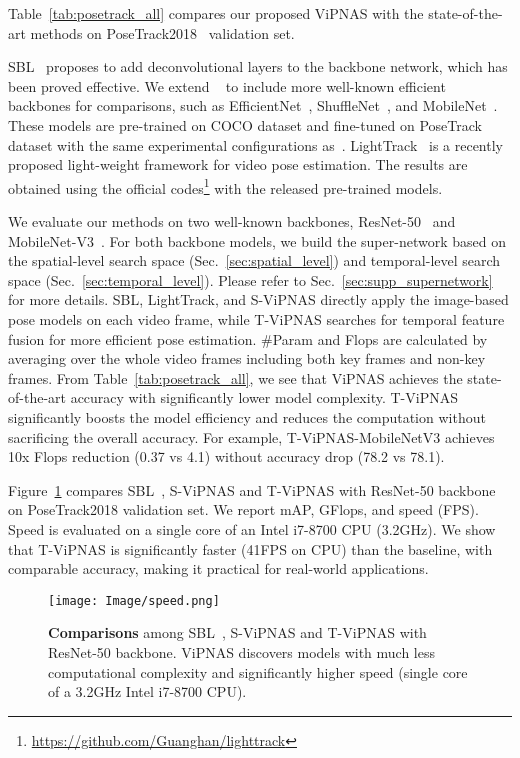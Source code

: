 \documentclass[final]{cvpr}
\begin{document}
Table~\ref{tab:posetrack_all} compares our proposed ViPNAS with the state-of-the-art methods on  PoseTrack2018~\cite{andriluka2018posetrack} validation set. 

SBL~\cite{xiao2018simple} proposes to add deconvolutional layers to the backbone network, which has been proved effective. We extend ~\cite{xiao2018simple} to include more well-known efficient backbones for comparisons, such as EfficientNet~\cite{tan2019efficientnet}, ShuffleNet~\cite{ma2018shufflenet}, and MobileNet~\cite{howard2019searching}. These models are pre-trained on COCO dataset and fine-tuned on PoseTrack dataset with the same experimental configurations as~\cite{xiao2018simple}. LightTrack~\cite{ning2019lighttrack} is a recently proposed light-weight framework for video pose estimation. The results are obtained using the official codes\footnote{\url{https://github.com/Guanghan/lighttrack}} with the released pre-trained models.

We evaluate our methods on two well-known backbones, \ie ResNet-50~\cite{he2016deep} and MobileNet-V3~\cite{howard2019searching}. For both backbone models, we build the super-network based on the spatial-level search space (Sec.~\ref{sec:spatial_level}) and temporal-level search space (Sec.~\ref{sec:temporal_level}). Please refer to Sec.~\ref{sec:supp_supernetwork} for more details. SBL, LightTrack, and S-ViPNAS directly apply the image-based pose models on each video frame, while T-ViPNAS searches for temporal feature fusion for more efficient pose estimation. \#Param and Flops are calculated by averaging over the whole video frames including both key frames and non-key frames. From Table~\ref{tab:posetrack_all}, we see that ViPNAS achieves the state-of-the-art accuracy with significantly lower model complexity. 
T-ViPNAS significantly boosts the model efficiency and reduces the computation without sacrificing the overall accuracy. For example, T-ViPNAS-MobileNetV3 achieves 10x Flops reduction (0.37 vs 4.1) without accuracy drop (78.2 vs 78.1). 

Figure~\ref{fig:speed} compares SBL~\cite{xiao2018simple}, S-ViPNAS and T-ViPNAS with ResNet-50 backbone on PoseTrack2018 validation set. We report mAP, GFlops, and speed (FPS). Speed is evaluated on a single core of an Intel i7-8700 CPU (3.2GHz). We show that T-ViPNAS is significantly faster (41FPS on CPU) than the baseline, with comparable accuracy, making it practical for real-world applications.

\begin{figure}[t]
	\centering
	\texttt{[image: Image/speed.png]}
	\caption{\textbf{Comparisons} among SBL~\cite{xiao2018simple}, S-ViPNAS and T-ViPNAS with ResNet-50 backbone. ViPNAS discovers models with much less computational complexity and significantly higher speed (single core of a 3.2GHz Intel i7-8700 CPU).}
	\label{fig:speed}
\end{figure}
\end{document}
